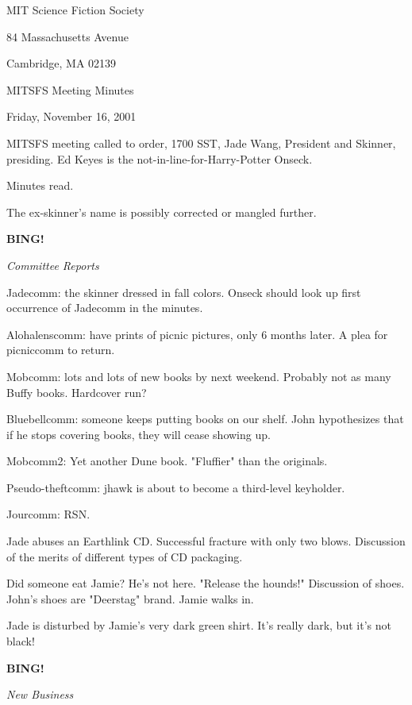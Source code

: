 \documentclass[12pt]{article}
\newcommand{\bing}{{\bf BING!} }
\newcommand{\goto}[1]{\bing \vskip 12pt \centerline{{\em{#1}}}}
\begin{document}
\begin{center}

MIT Science Fiction Society 

84 Massachusetts Avenue

Cambridge, MA 02139

\vspace{12pt}

MITSFS Meeting Minutes 

Friday, November 16, 2001

\end{center}
 
\vspace{18pt}

\setlength{\parskip}{6pt}

\noindent
MITSFS meeting called to order, 1700 SST, Jade Wang, President and Skinner, presiding.  Ed Keyes is the not-in-line-for-Harry-Potter Onseck.

Minutes read.

The ex-skinner's name is possibly corrected or mangled further.

\goto{Committee Reports}

Jadecomm: the skinner dressed in fall colors. Onseck should look up first occurrence of Jadecomm in the minutes.

Alohalenscomm: have prints of picnic pictures, only 6 months later. A plea for picniccomm to return.

Mobcomm: lots and lots of new books by next weekend. Probably not as many Buffy books. Hardcover run?

Bluebellcomm: someone keeps putting books on our shelf. John hypothesizes that if he stops covering books, they will cease showing up.

Mobcomm2: Yet another Dune book. "Fluffier" than the originals.

Pseudo-theftcomm: jhawk is about to become a third-level keyholder.

Jourcomm: RSN.

Jade abuses an Earthlink CD. Successful fracture with only two blows. Discussion of the merits of different types of CD packaging.

Did someone eat Jamie? He's not here. "Release the hounds!" Discussion of shoes. John's shoes are "Deerstag" brand. Jamie walks in.

Jade is disturbed by Jamie's very dark green shirt. It's really dark, but it's not black!

\goto{New Business}
\end{document}
